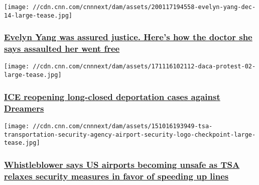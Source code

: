 \href{/2020/01/17/politics/evelyn-yang-doctor-sexual-assault-manhattan-da-vance/index.html}{}

\texttt{[image: //cdn.cnn.com/cnnnext/dam/assets/200117194558-evelyn-yang-dec-14-large-tease.jpg]}

\hypertarget{evelyn-yang-was-assured-justice-heres-how-the-doctor-she-says-assaulted-her-went-free-1}{%
\subsubsection{\texorpdfstring{\href{/2020/01/17/politics/evelyn-yang-doctor-sexual-assault-manhattan-da-vance/index.html}{Evelyn
Yang was assured justice. Here's how the doctor she says assaulted her
went
free}}{Evelyn Yang was assured justice. Here's how the doctor she says assaulted her went free}}\label{evelyn-yang-was-assured-justice-heres-how-the-doctor-she-says-assaulted-her-went-free-1}}

\href{/2019/12/21/us/ice-reopening-dreamer-deportation-cases-invs/index.html}{}

\texttt{[image: //cdn.cnn.com/cnnnext/dam/assets/171116102112-daca-protest-02-large-tease.jpg]}

\hypertarget{ice-reopening-long-closed-deportation-cases-against-dreamers-}{%
\subsubsection{\texorpdfstring{\href{/2019/12/21/us/ice-reopening-dreamer-deportation-cases-invs/index.html}{ICE
reopening long-closed deportation cases against Dreamers
}}{ICE reopening long-closed deportation cases against Dreamers }}\label{ice-reopening-long-closed-deportation-cases-against-dreamers-}}

\href{/2019/12/20/politics/tsa-whistleblower-airport-safety-invs/index.html}{}

\texttt{[image: //cdn.cnn.com/cnnnext/dam/assets/151016193949-tsa-transportation-security-agency-airport-security-logo-checkpoint-large-tease.jpg]}

\hypertarget{whistleblower-says-us-airports-becoming-unsafe-as-tsa-relaxes-security-measures-in-favor-of-speeding-up-lines}{%
\subsubsection{\texorpdfstring{\href{/2019/12/20/politics/tsa-whistleblower-airport-safety-invs/index.html}{Whistleblower
says US airports becoming unsafe as TSA relaxes security measures in
favor of speeding up
lines}}{Whistleblower says US airports becoming unsafe as TSA relaxes security measures in favor of speeding up lines}}\label{whistleblower-says-us-airports-becoming-unsafe-as-tsa-relaxes-security-measures-in-favor-of-speeding-up-lines}}


